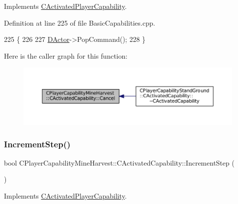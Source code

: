 Implements \hyperlink{classCActivatedPlayerCapability_a5cde83be468e262ad054d81e28684a81}{C\+Activated\+Player\+Capability}.



Definition at line 225 of file Basic\+Capabilities.\+cpp.


\begin{DoxyCode}
225                                                              \{
226 
227     \hyperlink{classCActivatedPlayerCapability_a54ca944b47bff2718330639941d402b0}{DActor}->PopCommand();
228 \}
\end{DoxyCode}
Here is the caller graph for this function\+:
\nopagebreak
\begin{figure}[H]
\begin{center}
\leavevmode
\includegraphics[width=350pt]{classCPlayerCapabilityMineHarvest_1_1CActivatedCapability_ab1fef064fbc085a6419b5a822e787614_icgraph}
\end{center}
\end{figure}
\hypertarget{classCPlayerCapabilityMineHarvest_1_1CActivatedCapability_a46dbd6e2ae2fb889da1714c97ed3ca2f}{}\label{classCPlayerCapabilityMineHarvest_1_1CActivatedCapability_a46dbd6e2ae2fb889da1714c97ed3ca2f} 
\subsubsection{\texorpdfstring{Increment\+Step()}{IncrementStep()}}
{\footnotesize\ttfamily bool C\+Player\+Capability\+Mine\+Harvest\+::\+C\+Activated\+Capability\+::\+Increment\+Step (\begin{DoxyParamCaption}{ }\end{DoxyParamCaption})\hspace{0.3cm}{\ttfamily [virtual]}}



Implements \hyperlink{classCActivatedPlayerCapability_a943b5999a57504399293250382c0ec6a}{C\+Activated\+Player\+Capability}.



